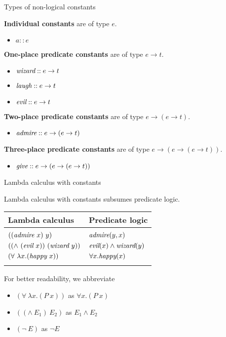 \documentclass[xcolor=dvipsnames]{beamer}
\begin{document}
\begin{frame}{Types of non-logical constants}

{\bf Individual constants} are of type {$e$}.
\begin{itemize}
\item $a :: e$ 
\end{itemize}\pause
{\bf One-place predicate constants} are of type {$e\to t$}.
\begin{itemize}
\item $\text{\em wizard} :: e\to t$
\item $\text{\em laugh} :: e\to t$
\item $\text{\em evil} :: e\to t$
\end{itemize}\pause
{\bf Two-place predicate constants} are of type {$e\to (e\to t)$}.
\begin{itemize}
\item $\text{\em admire} :: e\to (e\to t)$
\end{itemize}\pause
{\bf Three-place predicate constants} are of type {$e\to (e\to (e\to t))$}.
\begin{itemize}
\item $\text{\em give} :: e\to(e\to (e\to t))$
\end{itemize}
\end{frame}

\begin{frame}{Lambda calculus with constants}

Lambda calculus with constants subsumes predicate logic. 

\begin{center}
\begin{tabular}{ll}
\hline 
Lambda calculus & Predicate logic \\ 
\hline 
& \\
$((\text{\em admire}\ x)\ y)$ & $\text{\em admire}(y,x)$ \\
$((\land\ (\text{\em evil}\ x))\ (\text{\em wizard}\ y))$ & $\text{\em evil}(x)\land\text{\em wizard}(y)$ \\
$(\forall\ \lambda x.(\text{\em happy}\ x))$ & $\forall x.\text{\em happy}(x)$ \\
& \\
\hline
\end{tabular}
\end{center}\pause

For better readability, we abbreviate 
\begin{itemize}
\item {$(\forall\ \lambda x.(P\ x))$} as {$\forall x.(P\ x)$}
\item {$((\land\ E_1)\ E_2)$} as {$E_1\land E_2$}
\item {$(\lnot\ E)$} as {$\lnot E$}
\end{itemize}
\end{frame}
\end{document}
